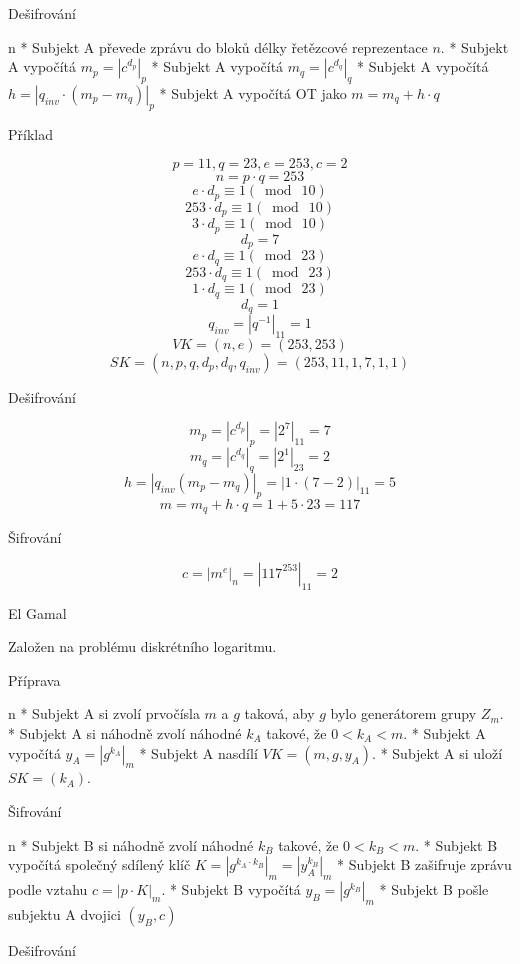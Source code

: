 \secc Dešifrování

\begitems \style n
* Subjekt A převede zprávu do bloků délky řetězcové reprezentace $n$.
* Subjekt A vypočítá $m_p = \left|c^{d_p}\right|_p$
* Subjekt A vypočítá $m_q = \left|c^{d_q}\right|_q$
* Subjekt A vypočítá $h = \left|q_{inv}\cdot\left(m_p - m_q\right)\right|_p$
* Subjekt A vypočítá OT jako $m = m_q + h \cdot q$
\enditems

\secc Příklad

$$p = 11, q = 23, e = 253, c = 2$$
$$n = p \cdot q = 253$$
$$e \cdot d_p \equiv 1 (\bmod\ 10)$$
$$253 \cdot d_p \equiv 1 (\bmod\ 10)$$
$$3 \cdot d_p \equiv 1 (\bmod\ 10)$$
$$d_p = 7$$
$$e \cdot d_q \equiv 1 (\bmod\ 23)$$
$$253 \cdot d_q \equiv 1 (\bmod\ 23)$$
$$1 \cdot d_q \equiv 1 (\bmod\ 23)$$
$$d_q = 1$$
$$q_{inv} = \left|q^{-1}\right|_{11} = 1$$
$$VK = \left(n, e\right) = \left(253, 253\right)$$
$$SK = \left(n, p, q, d_p, d_q, q_{inv}\right) = \left(253, 11, 1, 7, 1, 1\right)$$

Dešifrování

$$m_p = \left|c^{d_p}\right|_p = \left|2^7\right|_{11} = 7$$
$$m_q = \left|c^{d_q}\right|_q = \left|2^1\right|_{23} = 2$$
$$h = \left|q_{inv}\left(m_p - m_q\right)\right|_p = \left|1 \cdot \left(7 - 2\right)\right|_{11} = 5$$
$$m = m_q + h \cdot q = 1 + 5 \cdot 23 = 117$$

Šifrování

$$c = \left|m^e\right|_n = \left|117^253\right|_11 = 2$$

\sec El Gamal

Založen na problému diskrétního logaritmu.

\secc Příprava

\begitems \style n
* Subjekt A si zvolí prvočísla $m$ a $g$ taková, aby $g$ bylo generátorem grupy $Z_m$.
* Subjekt A si náhodně zvolí náhodné $k_A$ takové, že $0 < k_A < m$.
* Subjekt A vypočítá $y_A = \left|g^{k_A}\right|_m$
* Subjekt A nasdílí $VK = (m, g, y_A)$.
* Subjekt A si uloží $SK = (k_A)$.
\enditems

\secc Šifrování

\begitems \style n
* Subjekt B si náhodně zvolí náhodné $k_B$ takové, že $0 < k_B < m$.
* Subjekt B vypočítá společný sdílený klíč $K = \left|g^{k_A \cdot k_B}\right|_m = \left|y_A^{k_B}\right|_m$
* Subjekt B zašifruje zprávu podle vztahu $c = \left|p \cdot K\right|_m$.
* Subjekt B vypočítá $y_B = \left|g^{k_B}\right|_m$
* Subjekt B pošle subjektu A dvojici $\left(y_B, c\right)$
\enditems

\secc Dešifrování

